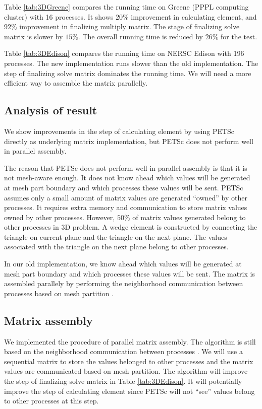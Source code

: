 \documentclass[11pt]{article}  %
\begin{document}
Table \ref{tab:3DGreene} compares the running time on Greene (PPPL computing cluster) with 16 processes. It shows $20\%$ improvement in calculating element, and $92\%$ improvement in finalizing multiply matrix. The stage of finalizing solve matrix is slower by $15\%$. The overall running time is reduced by $26\%$ for the test.

Table \ref{tab:3DEdison} compares the running time on NERSC Edison with 196 processes. The new implementation runs slower than the old implementation. The step of finalizing solve matrix dominates the running time. We will need a more efficient way to assemble  the matrix parallelly.

\subsection{Analysis of result}
We show improvements in the step of calculating element by using PETSc directly as underlying matrix implementation, but PETSc does not perform well in parallel assembly.

The reason that PETSc does not perform well in parallel assembly is that it is not mesh-aware enough. It does not know ahead which values will be generated at mesh part boundary and which processes these values will be sent. PETSc assumes only a small amount of matrix values are generated ``owned'' by other processes. It requires extra memory and communication to store matrix values owned by other processes. However, $50\%$ of matrix values generated belong to other processes in 3D problem. A wedge element is constructed by connecting the triangle on current plane and the triangle on the next plane. The values associated with the triangle on the next plane belong to other processes.

In our old implementation,  we know ahead  which values will be generated at mesh part boundary and which processes these values will be sent. The matrix is assembled parallely by performing the neighborhood communication between processes based on mesh partition \cite{sahni2009strong,ovcharenko2012neighborhood}.

\subsection{Matrix assembly}
We implemented the procedure of parallel matrix assembly. The algorithm is still based on the neighborhood communication between processes \cite{sahni2009strong,ovcharenko2012neighborhood}.  We will use a sequential matrix to store the values belonged to other processes and the matrix values are communicated based on mesh partition.  The algorithm will improve the step of  finalizing solve matrix in Table \ref{tab:3DEdison}. It will potentially improve the step of calculating element since PETSc will not ``see'' values belong to other processes at this step. 






\clearpage
\appendix

\end{document}
